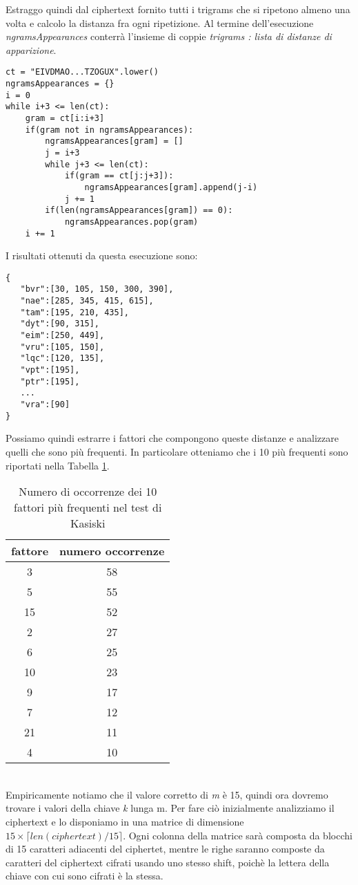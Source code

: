 \documentclass{article}
\begin{document}
Estraggo quindi dal ciphertext fornito tutti i trigrams che si ripetono almeno una volta e calcolo la distanza fra ogni ripetizione. Al termine dell'esecuzione \textit{ngramsAppearances} conterrà l'insieme di coppie \textit{trigrams : lista di distanze di apparizione}.
\begin{lstlisting}
ct = "EIVDMAO...TZOGUX".lower()
ngramsAppearances = {}
i = 0
while i+3 <= len(ct):
    gram = ct[i:i+3]
    if(gram not in ngramsAppearances):
        ngramsAppearances[gram] = [] 
        j = i+3
        while j+3 <= len(ct):
            if(gram == ct[j:j+3]):
                ngramsAppearances[gram].append(j-i)
            j += 1
        if(len(ngramsAppearances[gram]) == 0):
            ngramsAppearances.pop(gram)
    i += 1
\end{lstlisting}
I risultati ottenuti da questa esecuzione sono: 
\begin{lstlisting}
{
   "bvr":[30, 105, 150, 300, 390],
   "nae":[285, 345, 415, 615],
   "tam":[195, 210, 435],
   "dyt":[90, 315],
   "eim":[250, 449],
   "vru":[105, 150],
   "lqc":[120, 135],
   "vpt":[195],
   "ptr":[195],
   ...
   "vra":[90]
}
\end{lstlisting}
Possiamo quindi estrarre i fattori che compongono queste distanze e analizzare quelli che sono più frequenti. In particolare otteniamo che i 10 più frequenti sono riportati nella Tabella \ref{tab:occurr}.
\begin{table}[h]
    \centering
    \begin{tabular}{c|c}
        fattore & numero occorrenze \\ \hline
        3 & 58\\
        5 & 55\\
        15 & 52\\
        2 & 27\\
        6 & 25\\
        10 & 23\\
        9 & 17\\
        7 & 12\\
        21 & 11\\
        4 & 10
    \end{tabular}
    \caption{Numero di occorrenze dei 10 fattori più frequenti nel test di Kasiski}
    \label{tab:occurr}
\end{table}
\\
Empiricamente notiamo che il valore corretto di \textit{m} è 15, quindi ora dovremo trovare i valori della chiave \textit{k} lunga m.
Per fare ciò inizialmente analizziamo il ciphertext e lo disponiamo in una matrice di dimensione $15 \times \lceil len(ciphertext)/15 \rceil $. Ogni colonna della matrice sarà composta da blocchi di 15 caratteri adiacenti del ciphertet, mentre le righe saranno composte da caratteri del ciphertext cifrati usando uno stesso shift, poichè la lettera della chiave con cui sono cifrati è la stessa.
\end{document}
